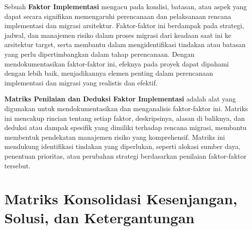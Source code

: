 Sebuah \textbf{Faktor Implementasi} mengacu pada kondisi, batasan, atau aspek yang dapat secara signifikan memengaruhi perencanaan dan pelaksanaan rencana implementasi dan migrasi arsitektur. Faktor-faktor ini berdampak pada strategi, jadwal, dan manajemen risiko dalam proses migrasi dari keadaan saat ini ke arsitektur target, serta membantu dalam mengidentifikasi tindakan atau batasan yang perlu dipertimbangkan dalam tahap perencanaan. Dengan mendokumentasikan faktor-faktor ini, efeknya pada proyek dapat dipahami dengan lebih baik, menjadikannya elemen penting dalam perencanaan implementasi dan migrasi yang realistis dan efektif.

\textbf{Matriks Penilaian dan Deduksi Faktor Implementasi} adalah alat yang digunakan untuk mendokumentasikan dan menganalisis faktor-faktor ini. Matriks ini mencakup rincian tentang setiap faktor, deskripsinya, alasan di baliknya, dan deduksi atau dampak spesifik yang dimiliki terhadap rencana migrasi, membantu membentuk pendekatan manajemen risiko yang komprehensif. Matriks ini mendukung identifikasi tindakan yang diperlukan, seperti alokasi sumber daya, penentuan prioritas, atau perubahan strategi berdasarkan penilaian faktor-faktor tersebut.

\section{Matriks Konsolidasi Kesenjangan, Solusi, dan Ketergantungan}


